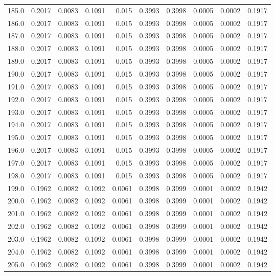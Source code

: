 \begin{longtable}{lrrrrrrrrr}
185.0 & 0.2017 & 0.0083 & 0.1091 & 0.015 & 0.3993 & 0.3998 & 0.0005 & 0.0002 & 0.1917 \\
186.0 & 0.2017 & 0.0083 & 0.1091 & 0.015 & 0.3993 & 0.3998 & 0.0005 & 0.0002 & 0.1917 \\
187.0 & 0.2017 & 0.0083 & 0.1091 & 0.015 & 0.3993 & 0.3998 & 0.0005 & 0.0002 & 0.1917 \\
188.0 & 0.2017 & 0.0083 & 0.1091 & 0.015 & 0.3993 & 0.3998 & 0.0005 & 0.0002 & 0.1917 \\
189.0 & 0.2017 & 0.0083 & 0.1091 & 0.015 & 0.3993 & 0.3998 & 0.0005 & 0.0002 & 0.1917 \\
190.0 & 0.2017 & 0.0083 & 0.1091 & 0.015 & 0.3993 & 0.3998 & 0.0005 & 0.0002 & 0.1917 \\
191.0 & 0.2017 & 0.0083 & 0.1091 & 0.015 & 0.3993 & 0.3998 & 0.0005 & 0.0002 & 0.1917 \\
192.0 & 0.2017 & 0.0083 & 0.1091 & 0.015 & 0.3993 & 0.3998 & 0.0005 & 0.0002 & 0.1917 \\
193.0 & 0.2017 & 0.0083 & 0.1091 & 0.015 & 0.3993 & 0.3998 & 0.0005 & 0.0002 & 0.1917 \\
194.0 & 0.2017 & 0.0083 & 0.1091 & 0.015 & 0.3993 & 0.3998 & 0.0005 & 0.0002 & 0.1917 \\
195.0 & 0.2017 & 0.0083 & 0.1091 & 0.015 & 0.3993 & 0.3998 & 0.0005 & 0.0002 & 0.1917 \\
196.0 & 0.2017 & 0.0083 & 0.1091 & 0.015 & 0.3993 & 0.3998 & 0.0005 & 0.0002 & 0.1917 \\
197.0 & 0.2017 & 0.0083 & 0.1091 & 0.015 & 0.3993 & 0.3998 & 0.0005 & 0.0002 & 0.1917 \\
198.0 & 0.2017 & 0.0083 & 0.1091 & 0.015 & 0.3993 & 0.3998 & 0.0005 & 0.0002 & 0.1917 \\
199.0 & 0.1962 & 0.0082 & 0.1092 & 0.0061 & 0.3998 & 0.3999 & 0.0001 & 0.0002 & 0.1942 \\
200.0 & 0.1962 & 0.0082 & 0.1092 & 0.0061 & 0.3998 & 0.3999 & 0.0001 & 0.0002 & 0.1942 \\
201.0 & 0.1962 & 0.0082 & 0.1092 & 0.0061 & 0.3998 & 0.3999 & 0.0001 & 0.0002 & 0.1942 \\
202.0 & 0.1962 & 0.0082 & 0.1092 & 0.0061 & 0.3998 & 0.3999 & 0.0001 & 0.0002 & 0.1942 \\
203.0 & 0.1962 & 0.0082 & 0.1092 & 0.0061 & 0.3998 & 0.3999 & 0.0001 & 0.0002 & 0.1942 \\
204.0 & 0.1962 & 0.0082 & 0.1092 & 0.0061 & 0.3998 & 0.3999 & 0.0001 & 0.0002 & 0.1942 \\
205.0 & 0.1962 & 0.0082 & 0.1092 & 0.0061 & 0.3998 & 0.3999 & 0.0001 & 0.0002 & 0.1942 \\

\end{longtable}
